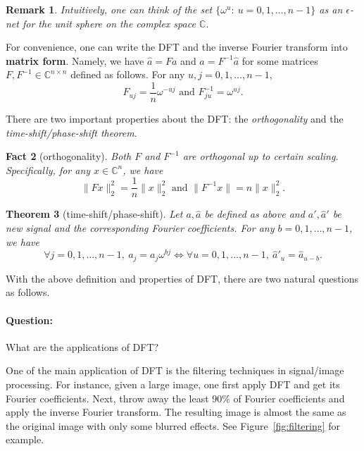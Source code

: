 \documentclass[11pt]{article}
\newcommand{\C}{\mathbb{C}}
\newtheorem{theorem}{Theorem}
\newtheorem{fact}[theorem]{Fact}
\newtheorem{remark}[theorem]{Remark}
\begin{document}
\begin{remark}
	Intuitively, one can think of the set $\{\omega^{u}:\ u=0,1,\dots,n-1 \}$ as an $\epsilon$-net for the unit sphere on the complex space $\C$.
\end{remark}

For convenience, one can write the DFT and the inverse Fourier transform into \textbf{matrix form}. Namely, we have $\hat{a}=Fa$ and $a=F^{-1}\hat{a}$ for some matrices $F,F^{-1}\in\C^{n\times n}$ defined as follows. For any $u,j=0,1,\dots,n-1$,
\begin{equation*}
F_{uj} = \frac{1}{n}\omega^{-uj}\text{ and } F^{-1}_{ju} = \omega^{uj}.
\end{equation*}

There are two important properties about the DFT: the \textit{orthogonality} and the \textit{time-shift/phase-shift theorem}.

\begin{fact}[orthogonality]
	Both $F$ and $F^{-1}$ are orthogonal up to certain scaling. Specifically, for any $x\in\C^n$, we have
	\begin{equation*}
	\|Fx\|_2^2=\frac{1}{n}\|x\|_2^2\text{ and } \|F^{-1}x\|=n\|x\|_2^2.
	\end{equation*}
\end{fact}

\begin{theorem}[time-shift/phase-shift]
	Let $a,\hat{a}$ be defined as above and $a',\hat{a}'$ be new signal and the corresponding Fourier coefficients. For any $b=0,1,\dots,n-1$, we have
	\begin{equation*}
	\forall j=0,1,\dots, n-1,\ a_j=a_j\omega^{bj} \Leftrightarrow \forall u=0,1,\dots,n-1,\ \hat{a}'_u=\hat{a}_{u-b}.
	\end{equation*}
\end{theorem}

With the above definition and properties of DFT, there are two natural questions as follows.
\paragraph{Question:} What are the applications of DFT?

One of the main application of DFT is the filtering techniques in signal/image processing. For instance, given a large image, one first apply DFT and get its Fourier coefficients. Next, throw away the least 90\% of Fourier coefficients and apply the inverse Fourier transform. The resulting image is almost the same as the original image with only some blurred effects. See Figure~\ref{fig:filtering} for example.
\end{document}
